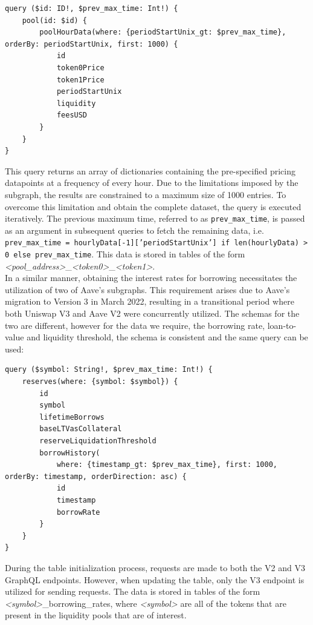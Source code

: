 \vspace{5mm}
\begin{lstlisting}
query ($id: ID!, $prev_max_time: Int!) {
    pool(id: $id) {
        poolHourData(where: {periodStartUnix_gt: $prev_max_time}, orderBy: periodStartUnix, first: 1000) {
            id
            token0Price
            token1Price
            periodStartUnix
            liquidity
            feesUSD
        }
    }
}
\end{lstlisting}
\vspace{5mm}
This query returns an array of dictionaries containing the pre-specified pricing datapoints at a frequency of every hour. Due to the limitations imposed by the subgraph, the results are constrained to a maximum size of 1000 entries. To overcome this limitation and obtain the complete dataset, the query is executed iteratively. The previous maximum time, referred to as \texttt{prev\_max\_time}, is passed as an argument in subsequent queries to fetch the remaining data, i.e. \texttt{prev\_max\_time = hourlyData[-1]['periodStartUnix'] if len(hourlyData) > 0 else prev\_max\_time}. This data is stored in tables of the form \textit{<pool\_address>}\_\textit{<token0>}\_\textit{<token1>}.
\\[5mm]
In a similar manner, obtaining the interest rates for borrowing necessitates the utilization of two of Aave's subgraphs. This requirement arises due to Aave's migration to Version 3 in March 2022, resulting in a transitional period where both Uniswap V3 and Aave V2 were concurrently utilized. The schemas for the two are different, however for the data we require, the borrowing rate, loan-to-value and liquidity threshold, the schema is consistent and the same query can be used:
\vspace{5mm}
\begin{lstlisting}
query ($symbol: String!, $prev_max_time: Int!) {
    reserves(where: {symbol: $symbol}) {
        id
        symbol
        lifetimeBorrows
        baseLTVasCollateral
        reserveLiquidationThreshold
        borrowHistory(
            where: {timestamp_gt: $prev_max_time}, first: 1000, orderBy: timestamp, orderDirection: asc) {
            id
            timestamp
            borrowRate
        }
    }
}
\end{lstlisting}
\vspace{5mm}
During the table initialization process, requests are made to both the V2 and V3 GraphQL endpoints. However, when updating the table, only the V3 endpoint is utilized for sending requests. The data is stored in tables of the form \textit{<symbol>}\_borrowing\_rates, where \textit{<symbol>} are all of the tokens that are present in the liquidity pools that are of interest.

